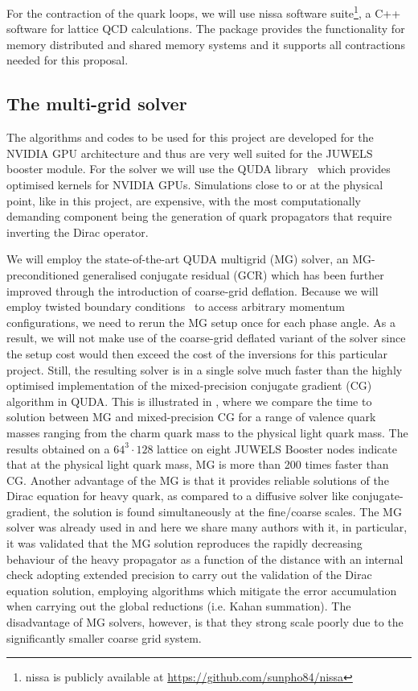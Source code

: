 For the contraction of the quark loops, we will use nissa software
suite\footnote{nissa is publicly available at
\url{https://github.com/sunpho84/nissa}}, a C++  software for lattice
QCD calculations. The package provides the functionality for memory
distributed and shared memory systems and it supports all contractions 
needed for this proposal.

\subsection{The multi-grid solver}
The algorithms and codes to be used for this project are developed  for the NVIDIA GPU architecture
and thus are very well suited for the JUWELS booster module. For the solver we will use the QUDA library~\cite{Clark:2009wm,Babich:2011np,Clark:2016rdz} which provides optimised kernels for NVIDIA GPUs.
Simulations close to or at the physical point, like in this project, are  expensive, with the most computationally demanding component being the generation of quark propagators that require inverting the Dirac operator.

We will employ the state-of-the-art QUDA multigrid (MG) solver, an MG-preconditioned generalised conjugate residual (GCR) which has been further improved through the introduction of coarse-grid deflation.
Because we will employ twisted boundary conditions~\cite{deDivitiis:2004kq} to access arbitrary momentum configurations, we need to rerun the MG setup once for each phase angle.
As a result, we will not make use of the coarse-grid deflated variant of the solver since the setup cost would then exceed the cost of the inversions for this particular project.
Still, the resulting solver is in a single solve much faster than the highly optimised implementation of the mixed-precision conjugate gradient (CG) algorithm in QUDA.
This is illustrated in , where we compare the time to solution between MG and mixed-precision CG for a range of valence quark masses ranging from the charm quark mass to the physical light quark mass.
The results obtained on a $64^3 \cdot 128$ lattice on eight JUWELS Booster nodes indicate that at the physical light quark mass, MG is more than 200 times faster than CG.
Another advantage of the MG  is that it provides reliable solutions
of the Dirac equation for heavy quark, as compared to a diffusive
solver like conjugate-gradient, the solution is found simultaneously at the fine/coarse scales. 
The MG solver was already used in \cite{Frezzotti:2024kqk} and here we share many authors with it,
in particular, it was validated that the MG solution reproduces the
rapidly decreasing behaviour of the heavy propagator as a function of the distance with an 
internal check adopting extended precision to carry out the validation of the Dirac equation solution,
employing algorithms which mitigate the error accumulation when carrying out the global reductions
(i.e. Kahan summation).
The disadvantage of MG solvers, however, is that they strong scale poorly due to the significantly smaller coarse grid system.

